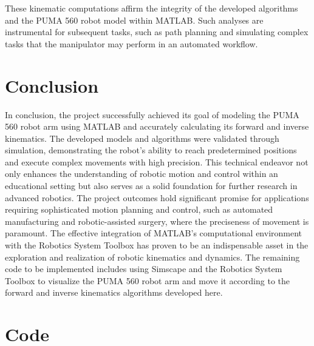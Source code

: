 \documentclass[conference]{IEEEtran}
\begin{document}
These kinematic computations affirm the integrity of the developed algorithms and the PUMA 560 robot model within MATLAB. Such analyses are instrumental for subsequent tasks, such as path planning and simulating complex tasks that the manipulator may perform in an automated workflow.

\section{Conclusion}
In conclusion, the project successfully achieved its goal of modeling the PUMA 560 robot arm using MATLAB and accurately calculating its forward and inverse kinematics. The developed models and algorithms were validated through simulation, demonstrating the robot's ability to reach predetermined positions and execute complex movements with high precision. This technical endeavor not only enhances the understanding of robotic motion and control within an educational setting but also serves as a solid foundation for further research in advanced robotics. The project outcomes hold significant promise for applications requiring sophisticated motion planning and control, such as automated manufacturing and robotic-assisted surgery, where the preciseness of movement is paramount. The effective integration of MATLAB's computational environment with the Robotics System Toolbox has proven to be an indispensable asset in the exploration and realization of robotic kinematics and dynamics. The remaining code to be implemented includes using Simscape and the Robotics System Toolbox to visualize the PUMA 560 robot arm and move it according to the forward and inverse kinematics algorithms developed here.


\appendices
\section{Code}
\end{document}

